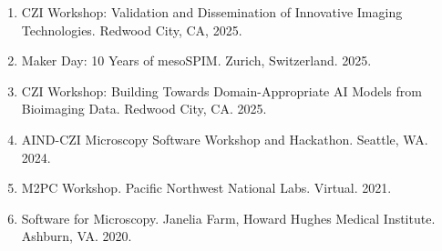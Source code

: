 \begin{enumerate}  
\item CZI Workshop: Validation and Dissemination of Innovative Imaging Technologies. Redwood City, CA, 2025.
\item Maker Day: 10 Years of mesoSPIM. Zurich, Switzerland. 2025.
\item CZI Workshop: Building Towards Domain-Appropriate AI Models from Bioimaging Data. Redwood City, CA. 2025.
\item AIND-CZI Microscopy Software Workshop and Hackathon. Seattle, WA. 2024.
\item M2PC Workshop.  Pacific Northwest National Labs. Virtual. 2021.
\item Software for Microscopy.  Janelia Farm, Howard Hughes Medical Institute.  Ashburn, VA. 2020. 
\end{enumerate}